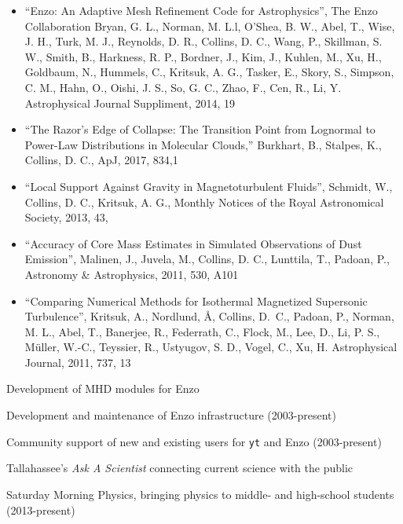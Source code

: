 \documentclass[11pt]{article}
\begin{document}
\begin{itemize}

  \item ``Enzo: An Adaptive Mesh Refinement Code for Astrophysics'', The Enzo
Collaboration 
Bryan, G. L., Norman, M. L.l, O’Shea, B. W.,  Abel, T.,  Wise, J. H.,
Turk, M. J., 
Reynolds, D. R.,
Collins, D. C.,
Wang, P., Skillman, S. W., Smith, B., Harkness, R. P., Bordner, J.,
Kim, J., Kuhlen, M., Xu, H.,
Goldbaum, N., Hummels, C., Kritsuk, A. G., Tasker, E., 
Skory, S., Simpson, C. M., Hahn, O., Oishi, J. S., So, G. C.,
Zhao, F., Cen, R., Li, Y.
Astrophysical Journal Suppliment, 2014,  19

\item ``The Razor’s Edge of Collapse: The Transition Point from Lognormal to Power-Law Distributions in Molecular Clouds,'' 
Burkhart, B., Stalpes, K., Collins, D. C.,
ApJ, 2017, 834,1

\item
``Local Support Against Gravity in Magnetoturbulent Fluids'',
Schmidt, W., Collins, D. C., Kritsuk, A. G.,
Monthly Notices of the Royal Astronomical Society, 2013, 43, 

\item
``Accuracy of Core Mass Estimates in Simulated Observations of Dust Emission'', 
Malinen, J., Juvela, M., Collins, D. C., Lunttila, T., Padoan, P.,
Astronomy \& Astrophysics, 2011, 530, A101

\item
``Comparing Numerical
Methods for Isothermal Magnetized Supersonic Turbulence'', 
Kritsuk, A., Nordlund, \AA, Collins, D.~C., 
Padoan, P., Norman, M. L., Abel, T., Banerjee, R., Federrath, C., Flock, M.,
Lee, D., Li, P. S., M\"uller, W.-C., Teyssier, R., Ustyugov, S. D., Vogel, C.,
Xu, H.
Astrophysical Journal, 2011, 737, 13

\end{itemize}



\medskip
\noindent Development of MHD modules for Enzo

\medskip
\noindent Development and maintenance of Enzo infrastructure (2003-present)

\medskip
\noindent Community support of new and existing users for {\tt yt} and Enzo
(2003-present)

\medskip
\noindent Tallahassee's \emph{Ask A Scientist} connecting current science with the public

\medskip
\noindent Saturday Morning Physics, bringing physics to middle- and high-school
students (2013-present)



%

%
\end{document}
